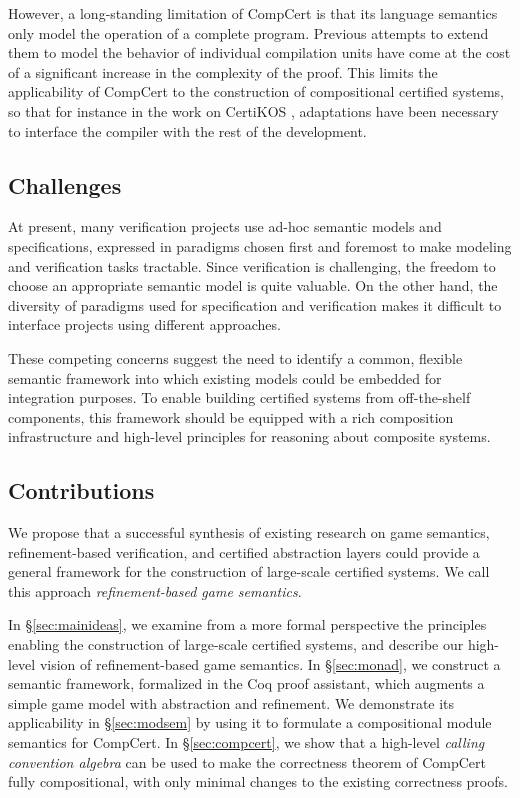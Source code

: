 \documentclass[acmsmall,timestamp,review,anonymous]{acmart}
\begin{document}
However,
a long-standing limitation of CompCert is that
its language semantics
only model the operation of a complete program.
Previous attempts to extend them
to model the behavior of individual compilation units
\cite{compcompcert,cpp15}
have come at the cost of a significant increase
in the complexity of the proof.
This limits the applicability of CompCert
to the construction of compositional certified systems,
so that for instance in the work on CertiKOS \cite{popl15,osdi16,ccal},
adaptations have been necessary
to interface the compiler with the rest of the development.


\subsection{Challenges} %

At present, many verification projects
use ad-hoc semantic models and specifications,
expressed in paradigms chosen first and foremost
to make modeling and verification tasks tractable.
Since verification is challenging,
the freedom to choose an appropriate semantic model
is quite valuable.
On the other hand,
the diversity of paradigms used for specification and verification
makes it difficult
to interface projects using different approaches.

These competing concerns
suggest the need to identify a common,
flexible semantic framework
into which existing models could be embedded
for integration purposes.
To enable building certified systems
from off-the-shelf components,
this framework should be equipped with
a rich composition infrastructure
and high-level principles for
reasoning about composite systems.


\subsection{Contributions} %

We propose that
a successful synthesis of existing research
on game semantics,
refinement-based verification,
and certified abstraction layers
could provide a general framework
for the construction of large-scale certified systems.
We call this approach \emph{refinement-based game semantics}.

In \S\ref{sec:mainideas},
we examine from a more formal perspective
the principles enabling the construction
of large-scale certified systems,
and describe our high-level vision of
refinement-based game semantics.
In \S\ref{sec:monad},
we construct a semantic framework, formalized in the Coq proof assistant,
which augments a simple game model
with abstraction and refinement.
We demonstrate its applicability in \S\ref{sec:modsem}
by using it to formulate a compositional module semantics
for CompCert.
In \S\ref{sec:compcert},
we show that a high-level
\emph{calling convention algebra}
can be used to make the correctness theorem of CompCert
fully compositional,
with only minimal changes to the existing correctness proofs.
\end{document}
